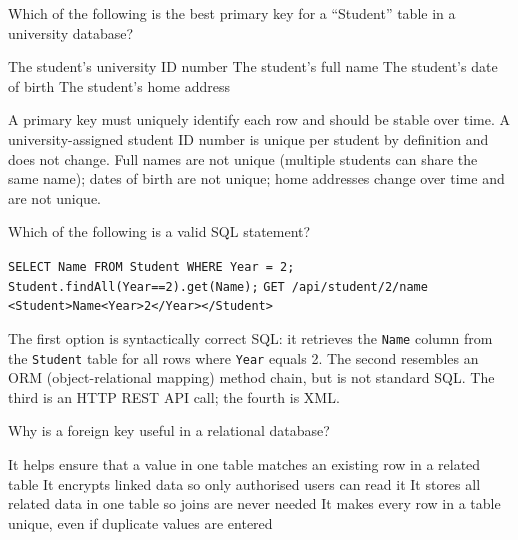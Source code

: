 \documentclass[answers]{exam}
\begin{document}
\begin{questions}
\question Which of the following is the best primary key for a ``Student'' table in a university database?

\begin{choices}
    \correctchoice The student's university ID number
    \choice The student's full name
    \choice The student's date of birth
    \choice The student's home address
\end{choices}

\begin{solution}
    A primary key must uniquely identify each row and should be stable over time.
    A university-assigned student ID number is unique per student by definition and does not change.
    Full names are not unique (multiple students can share the same name); dates of birth are not unique; home addresses change over time and are not unique.
\end{solution}

\question Which of the following is a valid SQL statement?

\begin{choices}
    \correctchoice \texttt{SELECT Name FROM Student WHERE Year = 2;}
    \choice \texttt{Student.findAll(Year==2).get(Name);}
    \choice \texttt{GET /api/student/2/name}
    \choice \texttt{<Student>Name<Year>2</Year></Student>}
\end{choices}

\begin{solution}
    The first option is syntactically correct SQL: it retrieves the \texttt{Name} column from the \texttt{Student} table for all rows where \texttt{Year} equals 2.
    The second resembles an ORM (object-relational mapping) method chain, but is not standard SQL.
    The third is an HTTP REST API call; the fourth is XML.
\end{solution}

\question Why is a foreign key useful in a relational database?

\begin{choices}
    \correctchoice It helps ensure that a value in one table matches an existing row in a related table
    \choice It encrypts linked data so only authorised users can read it
    \choice It stores all related data in one table so joins are never needed
    \choice It makes every row in a table unique, even if duplicate values are entered
\end{choices}


\end{questions}
\end{document}

